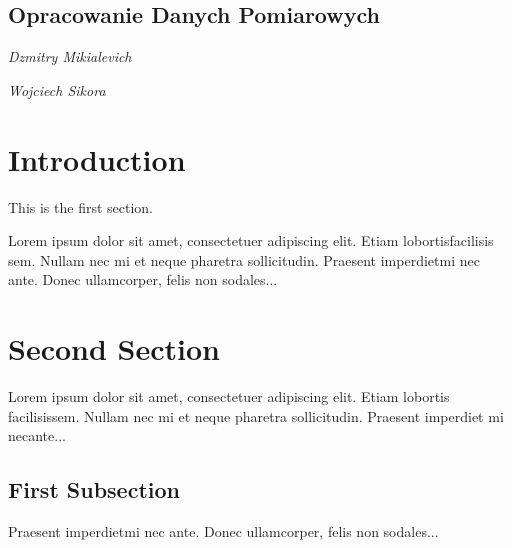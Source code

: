 \documentclass[18pt, twoside]{article}
\begin{document}
\begin{figure}[tp!]
\end{figure}
\begin{center}
    \section*{Opracowanie Danych Pomiarowych}
    \emph{Dzmitry Mikialevich}
\end{center}
\begin{center}
    \emph{Wojciech Sikora}
\end{center}

\section{Introduction}
This is the first section.
 
Lorem  ipsum  dolor  sit  amet,  consectetuer  adipiscing  
elit.   Etiam  lobortisfacilisis sem.  Nullam nec mi et 
neque pharetra sollicitudin.  Praesent imperdietmi nec ante. 
Donec ullamcorper, felis non sodales...
 
\section{Second Section}
 
Lorem ipsum dolor sit amet, consectetuer adipiscing elit.  
Etiam lobortis facilisissem.  Nullam nec mi et neque pharetra 
sollicitudin.  Praesent imperdiet mi necante...
 
\subsection{First Subsection}
Praesent imperdietmi nec ante. Donec ullamcorper, felis non sodales...
\end{document}
